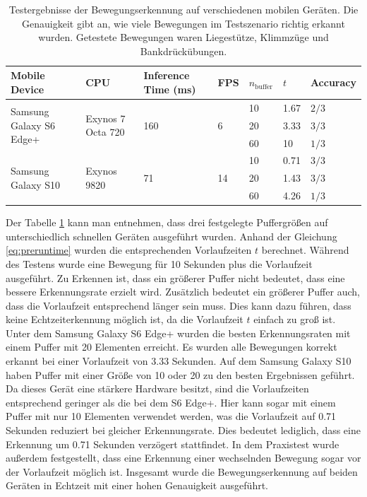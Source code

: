 \begin{table}
    \footnotesize
    \begin{tabularx}{\textwidth}{l|l|X|l|l|l|l}
        \hline
        Mobile Device & CPU & Inference Time (ms) & FPS & $n_\mathrm{buffer}$ & $t$ & Accuracy \\ \hline

        \multirow{3}{*}{Samsung Galaxy S6 Edge+} & \multirow{3}{*}{Exynos 7 Octa 720} & \multirow{3}{*}{160} & \multirow{3}{*}{6} & 10 & 1.67 & $2 / 3$ \\ \cline{5-7}
        & & & & 20 & 3.33 & $3 / 3$ \\ \cline{5-7}
        & & & & 60 & 10 & $1 / 3$ \\ \hline

        \multirow{3}{*}{Samsung Galaxy S10} & \multirow{3}{*}{Exynos 9820} & \multirow{3}{*}{71} & \multirow{3}{*}{14} & 10 & 0.71 & $3/3$  \\ \cline{5-7}
        & & & & 20 & 1.43 & $3/3$ \\ \cline{5-7}
        & & & & 60 & 4.26 & $1/3$ \\ \hline
    \end{tabularx}
    \caption{Testergebnisse der Bewegungserkennung auf verschiedenen mobilen Geräten. Die Genauigkeit gibt an, wie viele Bewegungen im Testszenario richtig erkannt wurden. Getestete Bewegungen waren Liegestütze, Klimmzüge und Bankdrückübungen.}
    \label{table:android-tests}
\end{table}

Der Tabelle \ref{table:android-tests} kann man entnehmen, dass drei festgelegte
Puffergrößen auf unterschiedlich schnellen Geräten ausgeführt wurden. Anhand
der Gleichung \ref{eq:preruntime} wurden die entsprechenden Vorlaufzeiten
$t$ berechnet. Während des Testens wurde eine Bewegung für 10 Sekunden plus die
Vorlaufzeit ausgeführt. Zu Erkennen ist, dass ein größerer Puffer nicht
bedeutet, dass eine bessere Erkennungsrate erzielt wird. Zusätzlich bedeutet
ein größerer Puffer auch, dass die Vorlaufzeit entsprechend länger sein muss.
Dies kann dazu führen, dass keine Echtzeiterkennung möglich ist, da die
Vorlaufzeit $t$ einfach zu groß ist. Unter dem Samsung Galaxy S6 Edge+ wurden
die besten Erkennungsraten mit einem Puffer mit 20 Elementen erreicht. Es
wurden alle Bewegungen korrekt erkannt bei einer Vorlaufzeit von 3.33 Sekunden.
Auf dem Samsung Galaxy S10 haben Puffer mit einer Größe von 10 oder 20 zu den
besten Ergebnissen geführt. Da dieses Gerät eine stärkere Hardware besitzt,
sind die Vorlaufzeiten entsprechend geringer als die bei dem S6 Edge+. Hier
kann sogar mit einem Puffer mit nur 10 Elementen verwendet werden, was die
Vorlaufzeit auf 0.71 Sekunden reduziert bei gleicher Erkennungsrate. Dies bedeutet
lediglich, dass eine Erkennung um 0.71 Sekunden verzögert stattfindet. In dem
Praxistest wurde außerdem festgestellt, dass eine Erkennung einer wechselnden
Bewegung sogar vor der Vorlaufzeit möglich ist.  Insgesamt wurde die
Bewegungserkennung auf beiden Geräten in Echtzeit mit einer hohen Genauigkeit
ausgeführt.
